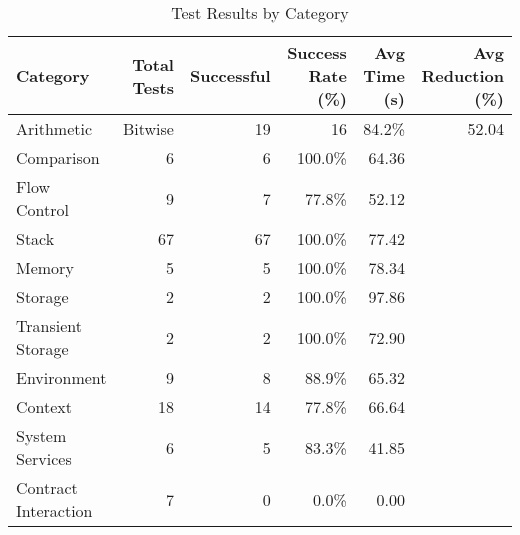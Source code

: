\begin{table}[htbp]
\centering
\caption{Test Results by Category}
\label{tab:step3_category_breakdown}
\begin{tabular}{lrrrrr}
\toprule
Category & Total Tests & Successful & Success Rate (\%) & Avg Time (s) & Avg Reduction (\%) \\
\midrule
Arithmetic & Bitwise & 19 & 16 & 84.2\% & 52.04 &  \\
Comparison & 6 & 6 & 100.0\% & 64.36 &  \\
Flow Control & 9 & 7 & 77.8\% & 52.12 &  \\
Stack & 67 & 67 & 100.0\% & 77.42 &  \\
Memory & 5 & 5 & 100.0\% & 78.34 &  \\
Storage & 2 & 2 & 100.0\% & 97.86 &  \\
Transient Storage & 2 & 2 & 100.0\% & 72.90 &  \\
Environment & 9 & 8 & 88.9\% & 65.32 &  \\
Context & 18 & 14 & 77.8\% & 66.64 &  \\
System Services & 6 & 5 & 83.3\% & 41.85 &  \\
Contract Interaction & 7 & 0 & 0.0\% & 0.00 &  \\
\bottomrule
\end{tabular}
\end{table}